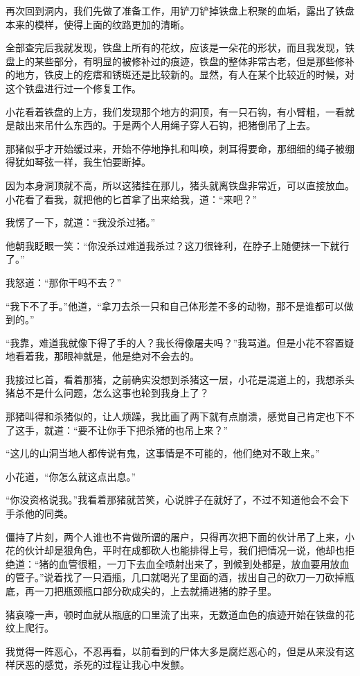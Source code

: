 再次回到洞内，我们先做了准备工作，用铲刀铲掉铁盘上积聚的血垢，露出了铁盘本来的模样，使得上面的纹路更加的清晰。

全部查完后我就发现，铁盘上所有的花纹，应该是一朵花的形状，而且我发现，铁盘上的某些部分，有明显的被修补过的痕迹，铁盘的整体非常古老，但是那些修补的地方，铁皮上的疙瘩和锈斑还是比较新的。显然，有人在某个比较近的时候，对这个铁盘进行过一个修复工作。

小花看着铁盘的上方，我们发现那个地方的洞顶，有一只石钩，有小臂粗，一看就是敲出来吊什么东西的。于是两个人用绳子穿人石钩，把猪倒吊了上去。

那猪似乎才开始缓过来，开始不停地挣扎和叫唤，刺耳得要命，那细细的绳子被绷得犹如琴弦一样，我生怕要断掉。

因为本身洞顶就不高，所以这猪挂在那儿，猪头就离铁盘非常近，可以直接放血。小花看了看我，就把他的匕首拿了出来给我，道：“来吧？”

我愣了一下，就道：“我没杀过猪。”

他朝我眨眼一笑：“你没杀过难道我杀过？这刀很锋利，在脖子上随便抹一下就行了。”

我怒道：“那你干吗不去？”

“我下不了手。”他道，“拿刀去杀一只和自己体形差不多的动物，那不是谁都可以做到的。”

“我靠，难道我就像下得了手的人？我长得像屠夫吗？”我骂道。但是小花不容置疑地看着我，那眼神就是，他是绝对不会去的。

我接过匕首，看着那猪，之前确实没想到杀猪这一层，小花是混道上的，我想杀头猪总不是什么问题，怎么这事也轮到我身上了？

那猪叫得和杀猪似的，让人烦躁，我比画了两下就有点崩溃，感觉自己肯定也下不了这手，就道：“要不让你手下把杀猪的也吊上来？”

“这儿的山洞当地人都传说有鬼，这事情是不可能的，他们绝对不敢上来。”

小花道，“你怎么就这点出息。”

“你没资格说我。”我看着那猪就苦笑，心说胖子在就好了，不过不知道他会不会下手杀他的同类。

僵持了片刻，两个人谁也不肯做所谓的屠户，只得再次把下面的伙计吊了上来，小花的伙计却是狠角色，平时在成都砍人也能排得上号，我们把情况一说，他却也拒绝道：“猪的血管很粗，一刀下去血全喷射出来了，到候到处都是，放血要用放血的管子。”说着找了一只酒瓶，几口就喝光了里面的酒，拔出自己的砍刀一刀砍掉瓶底，再一刀把瓶颈瓶口部分砍成尖的，上去就捅进猪的脖子里。

猪哀嚎一声，顿时血就从瓶底的口里流了出来，无数道血色的痕迹开始在铁盘的花纹上爬行。

我觉得一阵恶心，不忍再看，以前看到的尸体大多是腐烂恶心的，但是从来没有这样厌恶的感觉，杀死的过程让我心中发颤。

